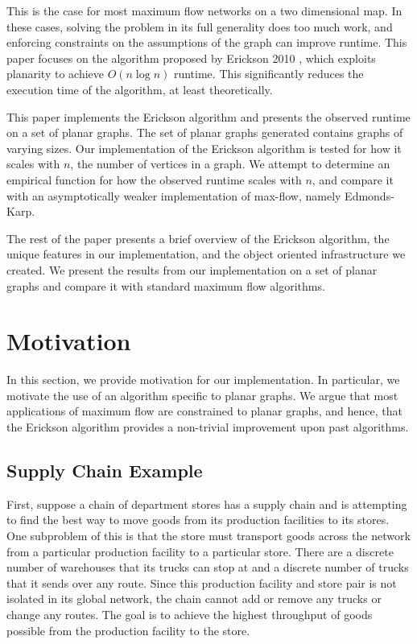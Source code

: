 \documentclass[12pt]{article}
\begin{document}
This is the case for most maximum flow networks on a two dimensional map. In these cases, solving the problem in its full generality does too much work, and enforcing constraints on the assumptions of the graph can improve runtime. This paper focuses on the algorithm proposed by Erickson 2010 \cite{erickson2010}, which exploits planarity to achieve $O(n \log n)$ runtime. This significantly reduces the execution time of the algorithm, at least theoretically.

This paper implements the Erickson algorithm and presents the observed runtime on a set of planar graphs. The set of planar graphs generated contains graphs of varying sizes. Our implementation of the Erickson algorithm is tested for how it scales with $n$, the number of vertices in a graph. We attempt to determine an empirical function for how the observed runtime scales with $n$, and compare it with an asymptotically weaker implementation of max-flow, namely Edmonds-Karp.

The rest of the paper presents a brief overview of the Erickson algorithm, the unique features in our implementation, and the object oriented infrastructure we created. We present the results from our implementation on a set of planar graphs and compare it with standard maximum flow algorithms.

\section{Motivation}

In this section, we provide motivation for our implementation. In particular, we motivate the use of an algorithm specific to planar graphs. We argue that most applications of maximum flow are constrained to planar graphs, and hence, that the Erickson algorithm provides a non-trivial improvement upon past algorithms. 

\subsection{Supply Chain Example}

First, suppose a chain of department stores has a supply chain and is attempting to find the best way to move goods from its production facilities to its stores. One subproblem of this is that the store must transport goods across the network from a particular production facility to a particular store. There are a discrete number of warehouses that its trucks can stop at and a discrete number of trucks that it sends over any route. Since this production facility and store pair is not isolated in its global network, the chain cannot add or remove any trucks or change any routes. The goal is to achieve the highest throughput of goods possible from the production facility to the store.
\end{document}
